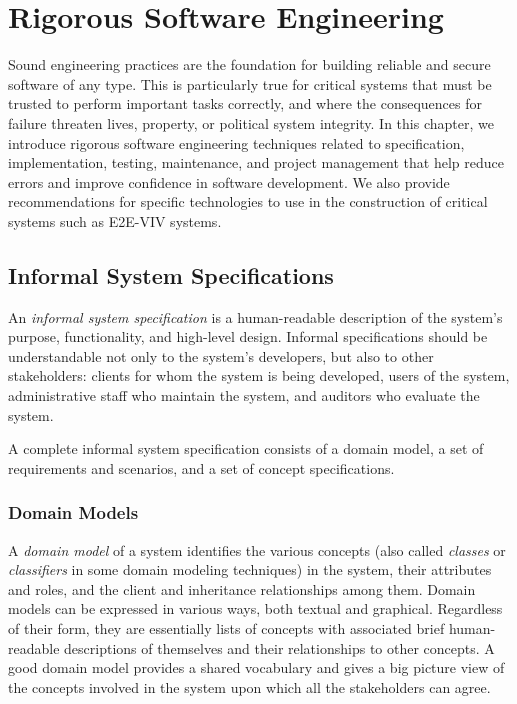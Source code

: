 \chapter{Rigorous Software Engineering}
\label{cha:rigor-softw-engin}

Sound engineering practices are the foundation for building reliable
and secure software of any type. This is particularly true for
critical systems that must be trusted to perform important tasks
correctly, and where the consequences for failure threaten lives,
property, or political system integrity. In this chapter, we introduce
rigorous software engineering techniques related to specification,
implementation, testing, maintenance, and project management that help
reduce errors and improve confidence in software development. We also
provide recommendations for specific technologies to use in the
construction of critical systems such as E2E-VIV systems.


\section{Informal System Specifications}

An \emph{informal system specification} is a human-readable
description of the system's purpose, functionality, and high-level
design. Informal specifications should be understandable not only to
the system's developers, but also to other stakeholders: clients for
whom the system is being developed, users of the system,
administrative staff who maintain the system, and auditors who
evaluate the system.

A complete informal system specification consists of a domain model, a
set of requirements and scenarios, and a set of concept
specifications.

\subsection{Domain Models}

A \emph{domain model} of a system identifies the various concepts
(also called \emph{classes} or \emph{classifiers} in some domain
modeling techniques) in the system, their attributes and roles, and
the client and inheritance relationships among them. Domain models can
be expressed in various ways, both textual and graphical. Regardless
of their form, they are essentially lists of concepts with associated
brief human-readable descriptions of themselves and their
relationships to other concepts. A good domain model provides a shared
vocabulary and gives a big picture view of the concepts involved in
the system upon which all the stakeholders can agree.

